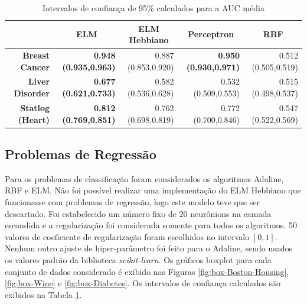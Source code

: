 \documentclass[conference]{IEEEtran}
\begin{document}
	\begin{table}[thpbh]
		\caption{Intervalos de confiança de 95\% calculados para a AUC média}
		\label{tab:classification}
		\centering
		\begin{tabular}{r|r|r|r|r|}
			\cline{2-5}
			\multicolumn{1}{l|}{}                          & \multicolumn{1}{c|}{\textbf{ELM}} & \multicolumn{1}{c|}{\textbf{ELM Hebbiano}} & \multicolumn{1}{c|}{\textbf{Perceptron}} & \multicolumn{1}{c|}{\textbf{RBF}} \\ \hline
			\multicolumn{1}{|r|}{\textbf{Breast Cancer}}   & \textbf{0.948 (0.935,0.963)}         & 0.887 (0.853,0.920)                           & \textbf{0.950 (0.930,0.971)}                & 0.512 (0.505,0.519)                  \\ \hline
			\multicolumn{1}{|r|}{\textbf{Liver Disorder}}  & \textbf{0.677 (0.621,0.733)}         & 0.582 (0.536,0.628)                           & 0.532 (0.509,0.553)                         & 0.515 (0.498,0.537)                  \\ \hline
			\multicolumn{1}{|r|}{\textbf{Statlog (Heart)}} & \textbf{0.812 (0.769,0.851)}         & 0.762 (0.698,0.819)                           & 0.772 (0.700,0.846)                         & 0.547 (0.522,0.569)                  \\ \hline
		\end{tabular}
	\end{table}

	\subsection{Problemas de Regressão}
	Para os problemas de classificação foram considerados os algoritmos Adaline, RBF e ELM. Não foi possível realizar uma implementação do ELM Hebbiano que funcionasse com problemas de regressão, logo este modelo teve que ser descartado. Foi estabelecido um número fixo de 20 neurônions na camada escondida e a regularização foi considerada somente para todos os algoritmos. 50 valores de coeficiente de regularização foram escolhidos no intervalo $[0,1]$. Nenhum outro ajuste de hiper-parâmetro foi feito para o Adaline, sendo usados os valores padrão da biblioteca \textit{scikit-learn}. Os gráficos boxplot para cada conjunto de dados considerado é exibido nas Figuras \ref{fig:box-Boston-Housing}, \ref{fig:box-Wine} e \ref{fig:box-Diabetes}.  Os intervalos de confiança calculados são exibidos na Tabela \ref{tab:classification}.
\end{document}
